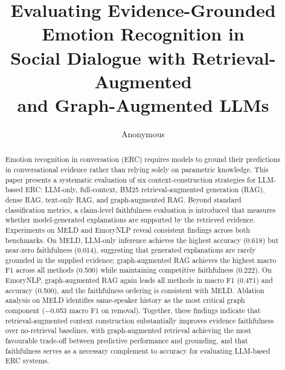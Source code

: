 \documentclass[runningheads]{llncs}
\begin{document}
\title{Evaluating Evidence-Grounded Emotion Recognition in\\
Social Dialogue with Retrieval-Augmented\\
and Graph-Augmented LLMs}


\author{Anonymous}


\maketitle

\begin{abstract}
Emotion recognition in conversation (ERC) requires models to ground their
predictions in conversational evidence rather than relying solely on
parametric knowledge. This paper presents a systematic evaluation of
six context-construction strategies for LLM-based ERC: LLM-only,
full-context, BM25 retrieval-augmented generation (RAG), dense RAG,
text-only RAG, and graph-augmented RAG. Beyond standard classification
metrics, a claim-level faithfulness evaluation is introduced that measures
whether model-generated explanations are supported by the retrieved
evidence. Experiments on MELD and EmoryNLP reveal consistent findings
across both benchmarks. On MELD, LLM-only inference achieves the
highest accuracy (0.618) but near-zero faithfulness (0.014), suggesting
that generated explanations are rarely grounded in the supplied evidence;
graph-augmented RAG achieves the highest macro F1 across all methods
(0.500) while maintaining competitive faithfulness (0.222). On EmoryNLP,
graph-augmented RAG again leads all methods in macro F1 (0.471) and
accuracy (0.500), and the faithfulness ordering is consistent with MELD.
Ablation analysis on MELD identifies same-speaker history as the most
critical graph component ($-$0.053 macro F1 on removal). Together,
these findings indicate that retrieval-augmented context construction
substantially improves evidence faithfulness over no-retrieval baselines,
with graph-augmented retrieval achieving the most favourable trade-off
between predictive performance and grounding, and that faithfulness
serves as a necessary complement to accuracy for evaluating LLM-based
ERC systems.

\end{abstract}
\end{document}

